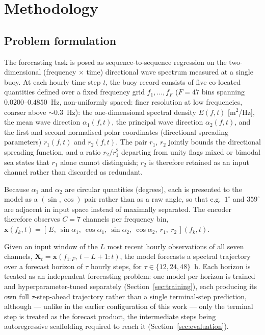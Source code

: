 \section{Methodology}
\label{sec:methods}

\subsection{Problem formulation}
\label{sec:problem}

The forecasting task is posed as sequence-to-sequence regression on the two-dimensional (frequency $\times$ time) directional wave spectrum measured at a single buoy. At each hourly time step $t$, the buoy record consists of
five co-located quantities defined over a fixed frequency grid $f_1,\dots,f_F$ ($F=47$ bins spanning $0.0200$--$0.4850$~Hz, non-uniformly spaced: finer resolution at low frequencies, coarser above $\sim$0.3~Hz): the one-dimensional spectral density $E(f,t)$ [m$^2$/Hz], the mean wave direction $\alpha_1(f,t)$, the principal wave direction $\alpha_2(f,t)$, and the first and second normalised polar coordinates (directional spreading parameters) $r_1(f,t)$ and $r_2(f,t)$. The pair $r_1$, $r_2$ jointly bounds the directional spreading function, and a ratio $r_2/r_1^2$ departing from unity flags mixed or bimodal sea states that $r_1$ alone cannot distinguish; $r_2$ is therefore retained as an input channel rather than discarded as redundant.

Because $\alpha_1$ and $\alpha_2$ are circular quantities (degrees), each is presented to the model as a $(\sin,\cos)$ pair rather than as a raw angle, so that e.g.\ $1^\circ$ and $359^\circ$ are adjacent in input space instead of maximally separated. The encoder therefore observes $C=7$ channels per frequency bin,
$\mathbf{x}(f_k,t) = [\,E,\ \sin\alpha_1,\ \cos\alpha_1,\ \sin\alpha_2,\ \cos\alpha_2,\ r_1,\ r_2\,](f_k,t)$.

Given an input window of the $L$ most recent hourly observations of all seven channels, $\mathbf{X}_t = \mathbf{x}(f_{1:F},\, t-L+1{:}t)$, the model forecasts a spectral trajectory over a forecast horizon of $\tau$ hourly steps, for $\tau \in \{12, 24, 48\}$~h. Each horizon is treated as an independent forecasting problem: one model per horizon is trained and hyperparameter-tuned separately (Section~\ref{sec:training}), each producing its own full $\tau$-step-ahead trajectory rather than a single terminal-step prediction, although — unlike in the earlier configuration of this work — only the terminal step is treated as the forecast product, the intermediate steps being autoregressive scaffolding required to reach it (Section~\ref{sec:evaluation}).

